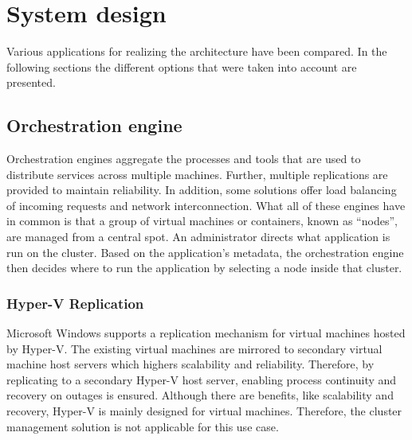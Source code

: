 \chapter{System design} %

\label{chap:design} %

Various applications for realizing the architecture have been compared. In the following sections the different options that were taken into account are presented.

\section{Orchestration engine}
Orchestration engines aggregate the processes and tools that are used to distribute services across multiple machines. Further, multiple replications are provided to maintain reliability. In addition, some solutions offer load balancing of incoming requests and network interconnection.
What all of these engines have in common is that a group of virtual machines or containers, known as \enquote{nodes}, are managed from a central spot. An administrator directs what application is run on the cluster. Based on the application's metadata, the orchestration engine then decides where to run the application by selecting a node inside that cluster.

\subsection{Hyper-V Replication} Microsoft \ac{Windows} supports a replication mechanism for virtual machines hosted by Hyper-V. The existing virtual machines are mirrored to secondary virtual machine host servers which highers scalability and reliability. Therefore, by replicating to a secondary Hyper-V host server, enabling process continuity and recovery on outages is ensured.
Although there are benefits, like scalability and recovery, Hyper-V is mainly designed for virtual machines. Therefore, the cluster management solution is not applicable for this use case.

